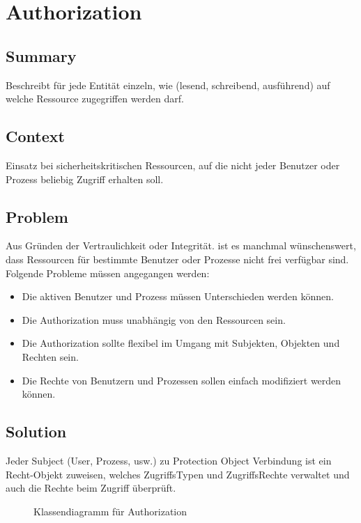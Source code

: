 \chapter{Authorization}

\section{Summary}
Beschreibt für jede Entität einzeln, wie (lesend, schreibend, ausführend) auf welche Ressource zugegriffen werden darf.

\section{Context}
Einsatz bei sicherheitskritischen Ressourcen, auf die nicht jeder Benutzer oder Prozess beliebig Zugriff erhalten soll.

\section{Problem}
Aus Gründen der Vertraulichkeit oder Integrität. ist es manchmal wünschenswert, dass Ressourcen für bestimmte Benutzer oder Prozesse nicht frei verfügbar sind. Folgende Probleme müssen angegangen werden:\\
\begin{itemize}{}{ }
  \item Die aktiven Benutzer und Prozess müssen Unterschieden werden können.
  \item Die Authorization muss unabhängig von den Ressourcen sein.
  \item Die Authorization sollte flexibel im Umgang mit Subjekten, Objekten und Rechten sein.
  \item Die Rechte von Benutzern und Prozessen sollen einfach modifiziert werden können.
\end{itemize}

\section{Solution}
Jeder Subject (User, Prozess, usw.) zu Protection Object Verbindung ist ein Recht-Objekt zuweisen, welches ZugriffsTypen und ZugriffsRechte verwaltet und auch die Rechte beim Zugriff überprüft.

\begin{figure}[H]
  \centering
  
  \caption{Klassendiagramm f\"ur Authorization}
\end{figure}

